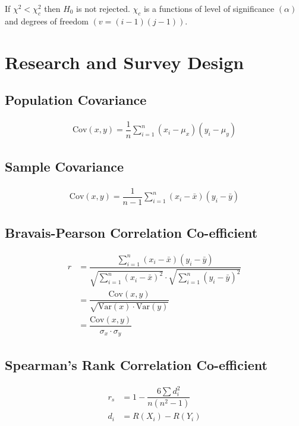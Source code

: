 \documentclass[openany, oneside]{book}
\begin{document}
If $\chi^2 < \chi_c^2$ then $H_0$ is not rejected. $\chi_c$ is a functions of level of significance $(\alpha)$ and degrees of freedom $(v = (i-1)(j-1))$.

\chapter{Research and Survey Design}
\section{Population Covariance}
\begin{align}
	\text{Cov}(x,y)=\dfrac{1}{n} \sum_{i=1}^n (x_i-\mu_x)(y_i-\mu_y)
\end{align}
\section{Sample Covariance}
\begin{align}
	\text{Cov}(x,y)=\dfrac{1}{n-1} \sum_{i=1}^n (x_i-\bar{x})(y_i-\bar{y})
\end{align}
\section{Bravais-Pearson Correlation Co-efficient}
\begin{align}
	r &= \dfrac{\sum_{i=1}^n (x_i-\bar{x})(y_i-\bar{y})}{\sqrt{\sum_{i=1}^n (x_i-\bar{x})^2} \cdot \sqrt{\sum_{i=1}^n (y_i -\bar{y})^2}}\\
	& = \dfrac{\text{Cov}(x,y)}{\sqrt{\text{Var}(x) \cdot \text{Var}(y)}}\\
	& = \dfrac{\text{Cov}(x,y)}{\sigma_x \cdot \sigma_y}
\end{align}
\section{Spearman's Rank Correlation  	Co-efficient}
\begin{align}
	r_s & = 1-\dfrac{6 \sum d_i^2}{n\left(n^2-1\right)}\\
	d_i &= R(X_i) - R(Y_i)
\end{align}
\end{document}
